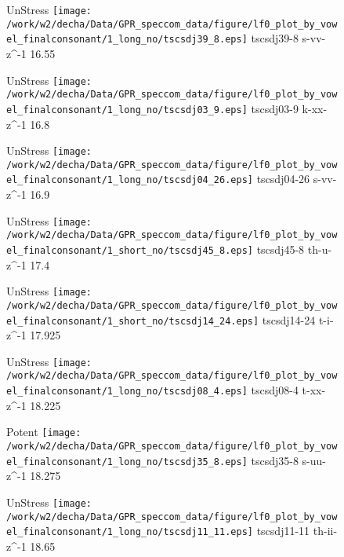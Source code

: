 \documentclass{article}
\begin{document}
\begin{figure}[t]
\begin{minipage}[b]{.24\textwidth}
UnStress
\centering
\texttt{[image: /work/w2/decha/Data/GPR\_speccom\_data/figure/lf0\_plot\_by\_vowel\_finalconsonant/1\_long\_no/tscsdj39\_8.eps]}
tscsdj39-8 s-vv-z\textasciicircum-1 16.55
\end{minipage}
\begin{minipage}[b]{.24\textwidth}
UnStress
\centering
\texttt{[image: /work/w2/decha/Data/GPR\_speccom\_data/figure/lf0\_plot\_by\_vowel\_finalconsonant/1\_long\_no/tscsdj03\_9.eps]}
tscsdj03-9 k-xx-z\textasciicircum-1 16.8
\end{minipage}
\begin{minipage}[b]{.24\textwidth}
UnStress
\centering
\texttt{[image: /work/w2/decha/Data/GPR\_speccom\_data/figure/lf0\_plot\_by\_vowel\_finalconsonant/1\_long\_no/tscsdj04\_26.eps]}
tscsdj04-26 s-vv-z\textasciicircum-1 16.9
\end{minipage}
\begin{minipage}[b]{.24\textwidth}
UnStress
\centering
\texttt{[image: /work/w2/decha/Data/GPR\_speccom\_data/figure/lf0\_plot\_by\_vowel\_finalconsonant/1\_short\_no/tscsdj45\_8.eps]}
tscsdj45-8 th-u-z\textasciicircum-1 17.4
\end{minipage}
\end{figure}

\begin{figure}[t]
\begin{minipage}[b]{.24\textwidth}
UnStress
\centering
\texttt{[image: /work/w2/decha/Data/GPR\_speccom\_data/figure/lf0\_plot\_by\_vowel\_finalconsonant/1\_short\_no/tscsdj14\_24.eps]}
tscsdj14-24 t-i-z\textasciicircum-1 17.925
\end{minipage}
\begin{minipage}[b]{.24\textwidth}
UnStress
\centering
\texttt{[image: /work/w2/decha/Data/GPR\_speccom\_data/figure/lf0\_plot\_by\_vowel\_finalconsonant/1\_long\_no/tscsdj08\_4.eps]}
tscsdj08-4 t-xx-z\textasciicircum-1 18.225
\end{minipage}
\begin{minipage}[b]{.24\textwidth}
\colorbox{Apricot}{Potent}
\centering
\texttt{[image: /work/w2/decha/Data/GPR\_speccom\_data/figure/lf0\_plot\_by\_vowel\_finalconsonant/1\_long\_no/tscsdj35\_8.eps]}
tscsdj35-8 s-uu-z\textasciicircum-1 18.275
\end{minipage}
\begin{minipage}[b]{.24\textwidth}
UnStress
\centering
\texttt{[image: /work/w2/decha/Data/GPR\_speccom\_data/figure/lf0\_plot\_by\_vowel\_finalconsonant/1\_long\_no/tscsdj11\_11.eps]}
tscsdj11-11 th-ii-z\textasciicircum-1 18.65
\end{minipage}
\end{figure}
\end{document}
